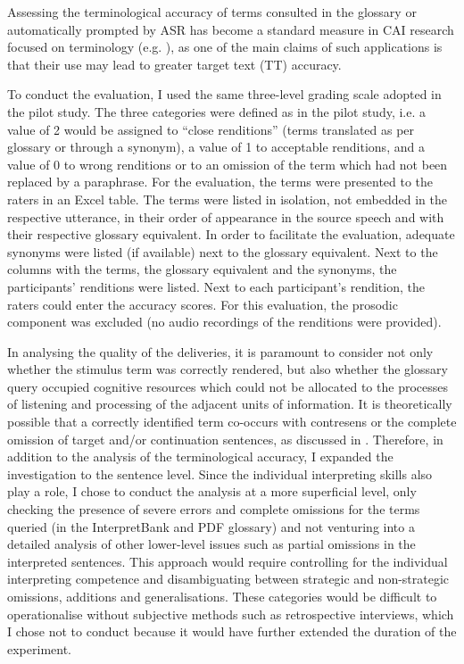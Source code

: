 Assessing the terminological accuracy of terms consulted in the glossary or automatically prompted by ASR has become a standard measure in CAI research focused on terminology (e.g. \citealt{biagini_glossario_2015,prandi_uso_2015,prandi_use_2015}), as one of the main claims of such applications is that their use may lead to greater target text (TT) accuracy.

To conduct the evaluation, I used the same three-level grading scale adopted in the pilot study. The three categories were defined as in the pilot study, i.e. a value of 2 would be assigned to ``close renditions'' (terms translated as per glossary or through a synonym), a value of 1 to acceptable renditions, and a value of 0 to wrong renditions or to an omission of the term which had not been replaced by a paraphrase. For the evaluation, the terms were presented to the raters in an Excel table. The terms were listed in isolation, not embedded in the respective utterance, in their order of appearance in the source speech and with their respective glossary equivalent. In order to facilitate the evaluation, adequate synonyms were listed (if available) next to the glossary equivalent. Next to the columns with the terms, the glossary equivalent and the synonyms, the participants' renditions were listed. Next to each participant's rendition, the raters could enter the accuracy scores. For this evaluation, the prosodic component was excluded (no audio recordings of the renditions were provided).

In analysing the quality of the deliveries, it is paramount to consider not only whether the stimulus term was correctly rendered, but also whether the glossary query occupied cognitive resources which could not be allocated to the processes of listening and processing of the adjacent units of information. It is theoretically possible that a correctly identified term co-occurs with contresens or the complete omission of target and/or continuation sentences, as discussed in . Therefore, in addition to the analysis of the terminological accuracy, I expanded the investigation to the sentence level.
Since the individual interpreting skills also play a role, I chose to conduct the analysis at a more superficial level, only checking the presence of severe errors and complete omissions for the terms queried (in the InterpretBank and PDF glossary) and not venturing into a detailed analysis of other lower-level issues such as partial omissions in the interpreted sentences. This approach would require controlling for the individual interpreting competence and disambiguating between strategic and non-strategic omissions, additions and generalisations. These categories would be difficult to operationalise without subjective methods such as retrospective interviews, which I chose not to conduct because it would have further extended the duration of the experiment.

